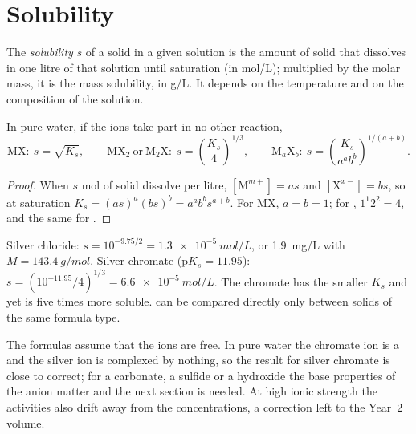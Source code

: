 \section{Solubility}

\begin{definition}[Solubility]\label{def:b1:precipitation:solubility}
The \emph{solubility} $s$ of a solid in a given solution
is the amount of solid that dissolves in one litre of that solution
until saturation (in \unit{mol/L}); multiplied by the molar mass, it is
the mass solubility, in \unit{g/L}. It depends on the temperature and on
the composition of the solution.
\end{definition}

\begin{proposition}\label{prop:b1:precipitation:s-of-ks}
In pure water, if the ions take part in no other reaction,
\[
  \mathrm{MX}:\ s = \sqrt{K_s}, \qquad
  \mathrm{MX_2}\ \text{or}\ \mathrm{M_2X}:\ s = \left(\frac{K_s}{4}\right)^{1/3},
  \qquad
  \mathrm{M}_a\mathrm{X}_b:\ s = \left(\frac{K_s}{a^a b^b}\right)^{1/(a+b)} .
\]
\end{proposition}

\begin{proof}
When $s$ mol of solid dissolve per litre, $[\mathrm{M}^{m+}] = as$ and
$[\mathrm{X}^{x-}] = bs$, so at saturation $K_s = (as)^a(bs)^b =
a^a b^b s^{a+b}$. For MX, $a = b = 1$; for , $1^1 2^2 = 4$, and the
same for .
\end{proof}

\begin{example}\label{ex:b1:precipitation:agcl-ag2cro4}
Silver chloride: $s = 10^{-9.75/2} = \qty{1.3e-5}{mol/L}$, or
\qty{1.9}{mg/L} with $M = \qty{143.4}{g/mol}$. Silver chromate 
($\mathrm{p}K_s = 11.95$): $s = (10^{-11.95}/4)^{1/3} =
\qty{6.6e-5}{mol/L}$. The chromate has the smaller $K_s$ and yet is five
times more soluble.  can be compared directly only
between solids of the same formula type.
\end{example}

\begin{remark}
The formulas assume that the ions are free. In pure water the chromate
ion is a  and the silver ion is complexed by nothing, so the
result for silver chromate is close to correct; for a carbonate, a
sulfide or a hydroxide the base properties of the anion matter and the
next section is needed. At high ionic strength the activities also drift
away from the concentrations, a correction left to the Year~2 volume.
\end{remark}

